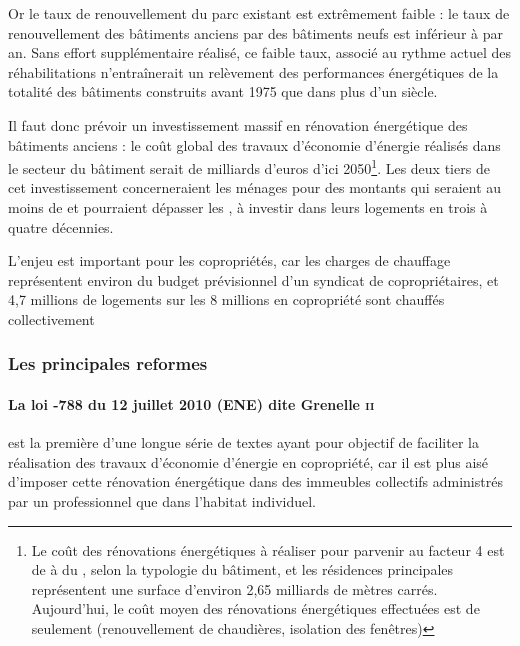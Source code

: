 			Or le taux de renouvellement du parc existant est extrêmement faible : le taux de renouvellement des bâtiments anciens par des bâtiments neufs est inférieur à  par an. Sans effort supplémentaire réalisé, ce faible taux, associé au rythme actuel des réhabilitations n'entraînerait un relèvement des performances énergétiques de la totalité des bâtiments construits avant 1975 que dans plus d'un siècle.
			
			Il faut donc prévoir un investissement massif en rénovation énergétique des bâtiments anciens : le coût global des travaux d'économie d'énergie réalisés dans le secteur du bâtiment serait de  milliards d’euros d’ici 2050\footnote{Le coût des rénovations énergétiques à réaliser pour parvenir au facteur 4 est de  à  du \metreCarre, selon la typologie du bâtiment, et les résidences principales représentent une surface d'environ 2,65 milliards de mètres carrés. Aujourd’hui, le coût moyen des rénovations énergétiques effectuées est de  seulement (renouvellement de chaudières, isolation des fenêtres)}.
			Les deux tiers de cet investissement concerneraient les ménages pour des montants qui seraient au moins de  et pourraient dépasser les , à investir dans leurs logements en trois à quatre décennies.
			
			L'enjeu est important pour les copropriétés, car les charges de chauffage représentent environ  du budget prévisionnel d'un syndicat de copropriétaires, et 4,7 millions de logements sur les 8 millions en copropriété sont chauffés collectivement
			
		\subsubsection{Les principales reformes}
		
			\paragraph{La loi -788 du 12 juillet 2010 (ENE) dite Grenelle \textsc{ii}} est la première d’une longue série de textes ayant pour objectif de faciliter la réalisation des travaux d’économie d’énergie en copropriété, car il est plus aisé d’imposer cette rénovation énergétique dans des immeubles collectifs administrés par un professionnel que dans l’habitat individuel.
				
